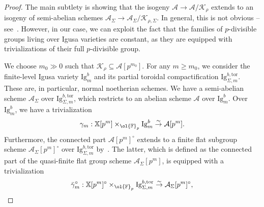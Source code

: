 \documentclass[letterpaper,11pt]{amsart}
\begin{document}
\begin{proof} The main subtlety is showing that the isogeny $\mathcal{A}\to \mathcal{A}/\mathcal{K}_{\rho}$ extends to an isogeny of semi-abelian schemes $\mathcal{A}_{\Sigma}\to \mathcal{A}_{\Sigma}/ \mathcal{K}_{\rho, \Sigma}$. In general, this is not obvious -- see~\cite[\S 6]{deJong-Oort}. However, in our case, we can exploit the fact that the families of $p$-divisible groups living over Igusa varieties are constant, as they are equipped with trivializations of their full $p$-divisible group. 

We choose $m_0\gg 0$ such that $\mathcal{K}_{\rho}\subseteq \mathcal{A}[p^{m_0}]$. For any $m\geq m_0$, we consider the finite-level Igusa variety $\mathrm{Ig}^b_{m}$ and its partial toroidal compactification $\mathrm{Ig}^{b,\mathrm{tor}}_{\Sigma, m}$. These are, in particular, normal noetherian schemes. We have a semi-abelian scheme $\mathcal{A}_{\Sigma}$ over $\mathrm{Ig}^{b,\mathrm{tor}}_{\Sigma, m}$, which restricts to an abelian scheme $\mathcal{A}$ over $\mathrm{Ig}^b_m$. Over $\mathrm{Ig}^b_{m}$, we have a trivialization 
\[
\gamma_m: \mathbb{X}[p^m]\times_{\ol{\mathbb{F}}_p} \mathrm{Ig}^b_m\stackrel{\sim}{\to} \mathcal{A}[p^m].
\]
Furthermore, the connected part $\mathcal{A}[p^m]^\circ$ extends to a finite flat subgroup scheme $\mathcal{A}_{\Sigma}[p^m]^\circ$ over $\mathrm{Ig}^{b,\mathrm{tor}}_{\Sigma, m}$ by~\cite[Prop. 3.2.1]{CS2}. The latter, which is defined as the connected part of the quasi-finite flat group scheme $\mathcal{A}_{\Sigma}[p^m]$, is equipped with a trivialization 
\[
\bar{\gamma}_m^\circ : \mathbb{X}[p^m]^\circ \times_{\ol{\mathbb{F}}_p} \mathrm{Ig}^{b,\mathrm{tor}}_{\Sigma, m}\stackrel{\sim}{\to} 
\mathcal{A}_{\Sigma}[p^m]^\circ,
\]

\end{proof}
\end{document}
